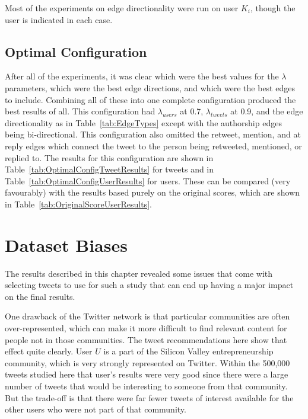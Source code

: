 Most of the experiments on edge directionality were run on user $K_{i}$, though the user is indicated in each case.



\subsection{Optimal Configuration}
\label{sec:OptimalConfiguration}

After all of the experiments, it was clear which were the best values for the $\lambda$ parameters, which were the best edge directions, and which were the best edges to include. Combining all of these into one complete configuration produced the best results of all. This configuration had $\lambda_{users}$ at 0.7, $\lambda_{tweets}$ at 0.9, and the edge directionality as in Table~\ref{tab:EdgeTypes} except with the authorship edges being bi-directional. This configuration also omitted the retweet, mention, and at reply edges which connect the tweet to the person being retweeted, mentioned, or replied to. The results for this configuration are shown in Table~\ref{tab:OptimalConfigTweetResults} for tweets and in Table~\ref{tab:OptimalConfigUserResults} for users. These can be compared (very favourably) with the results based purely on the original scores, which are shown in Table~\ref{tab:OriginalScoreUserResults}.


\section{Dataset Biases}

The results described in this chapter revealed some issues that come with selecting tweets to use for such a study that can end up having a major impact on the final results.

One drawback of the Twitter network is that particular communities are often over-represented, which can make it more difficult to find relevant content for people not in those communities. The tweet recommendations here show that effect quite clearly. User $U$ is a part of the Silicon Valley entrepreneurship community, which is very strongly represented on Twitter. Within the 500,000 tweets studied here that user's results were very good since there were a large number of tweets that would be interesting to someone from that community. But the trade-off is that there were far fewer tweets of interest available for the other users who were not part of that community.


